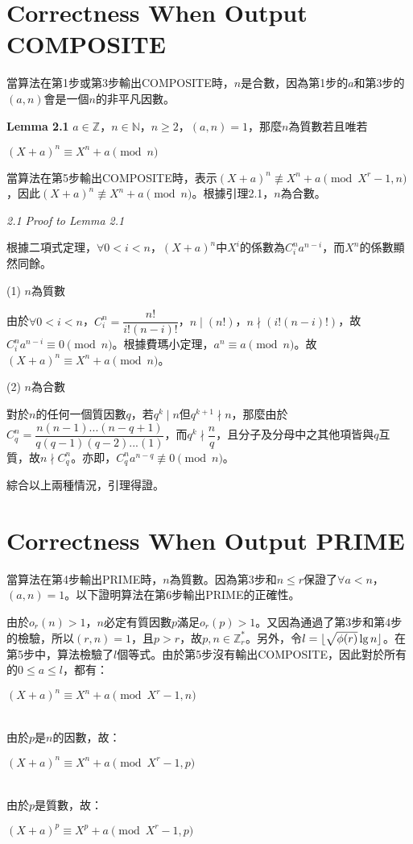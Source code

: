 \documentclass{article}
\DeclarePairedDelimiter\floor{\lfloor}{\rfloor}
\newcommand{\nequiv}{\not\equiv}
\begin{document}
\section{Correctness When Output COMPOSITE}

    當算法在第1步或第3步輸出COMPOSITE時，$n$是合數，因為第1步的$a$和第3步的$(a,n)$會是一個$n$的非平凡因數。

\begin{mdframed}
\noindent\textbf{Lemma 2.1} $a\in\mathbb{Z}$，$n\in\mathbb{N}$，$n\geq 2$，$(a,n)=1$，那麼$n$為質數若且唯若\\
    \centerline{$(X+a)^n\equiv X^n+a \pmod{n}$}
\end{mdframed}

    當算法在第5步輸出COMPOSITE時，表示$(X+a)^n\nequiv X^n+a \pmod{X^r-1, n}$，因此$(X+a)^n\nequiv X^n+a \pmod{n}$。根據引理2.1，$n$為合數。

\vspace{12pt}
\noindent\textit{2.1 Proof to Lemma 2.1} 

    根據二項式定理，$\forall 0<i<n$，$(X+a)^n$中$X^i$的係數為$C^n_ia^{n-i}$，而$X^n$的係數顯然同餘。

    \noindent (1) $n$為質數
    
        由於$\forall 0<i<n$，$C^n_i=\dfrac{n!}{i!(n-i)!}$，$n\mid(n!)$，$n\nmid(i!(n-i)!)$，故$C^n_ia^{n-i}\equiv 0\pmod{n}$。根據費瑪小定理，$a^n\equiv a\pmod{n}$。故$(X+a)^n\equiv X^n+a \pmod{n}$。

    \noindent (2) $n$為合數

        對於$n$的任何一個質因數$q$，若$q^k\mid n$但$q^{k+1}\nmid n$，那麼由於$C^n_q=\dfrac{n(n-1)...(n-q+1)}{q(q-1)(q-2)...(1)}$，而$q^k\nmid\dfrac{n}{q}$，且分子及分母中之其他項皆與$q$互質，故$n\nmid C^n_q$。亦即，$C^n_qa^{n-q}\not\equiv 0\pmod{n}$。

        綜合以上兩種情況，引理得證。

\section{Correctness When Output PRIME}

    當算法在第4步輸出PRIME時，$n$為質數。因為第3步和$n\leq r$保證了$\forall a<n$，$(a,n)=1$。以下證明算法在第6步輸出PRIME的正確性。

    由於$o_r(n)>1$，$n$必定有質因數$p$滿足$o_r(p)>1$。又因為通過了第3步和第4步的檢驗，所以$(r,n)=1$，且$p>r$，故$p,n\in \mathbb{Z}_r^*$。另外，令$l=\floor{\sqrt{\phi(r)}\lg n}$。在第5步中，算法檢驗了$l$個等式。由於第5步沒有輸出COMPOSITE，因此對於所有的$0\leq a\leq l$，都有：\\
    \centerline{$(X+a)^n\equiv X^n+a\pmod{X^r-1, n}$}\\
由於$p$是$n$的因數，故：\\
    \centerline{$(X+a)^n\equiv X^n+a\pmod{X^r-1, p}$}\\
由於$p$是質數，故：\\
    \centerline{$(X+a)^p\equiv X^p+a\pmod{X^r-1, p}$}\\
\end{document}
